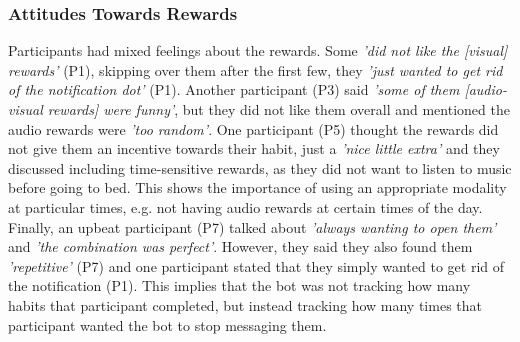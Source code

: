 \documentclass{scaffold/sigchi}
\begin{document}
\subsubsection{Attitudes Towards Rewards}
Participants had mixed feelings about the rewards. Some \textit{'did not like the [visual] rewards'} (P1), skipping over them after the first few, they \textit{'just wanted to get rid of the notification dot'} (P1). Another participant (P3) said \textit{'some of them [audio-visual rewards] were funny'}, but they did not like them overall and mentioned the audio rewards were \textit{'too random'}. One participant (P5) thought the rewards did not give them an incentive towards their habit, just a \textit{'nice little extra'} and they discussed including time-sensitive rewards, as they did not want to listen to music before going to bed. This shows the importance of using an appropriate modality at particular times, e.g. not having audio rewards at certain times of the day. Finally, an upbeat participant (P7) talked about \textit{'always wanting to open them'} and \textit{'the combination was perfect'}. However, they said they also found them \textit{'repetitive'} (P7) and one participant stated that they simply wanted to get rid of the notification (P1). This implies that the bot was not tracking how many habits that participant completed, but instead tracking how many times that participant wanted the bot to stop messaging them.
\end{document}
